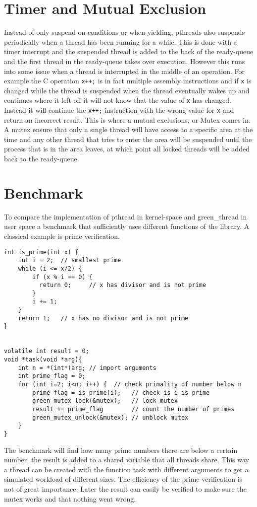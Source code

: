 \documentclass[a4paper,10pt]{article}
\begin{document}
\section*{Timer and Mutual Exclusion}
Instead of only suspend on conditions or when yielding, pthreads also suspends periodically when a thread has been running for a while. This is done with a timer interrupt and the suspended thread is added to the back of the ready-queue and the first thread in the ready-queue takes over execution. However this runs into some issue when a thread is interrupted in the middle of an operation. For example the C operation \lstinline{x++;} is in fact multiple assembly instructions and if \lstinline{x} is changed while the thread is suspended when the thread eventually wakes up and continues where it left off it will not know that the value of \lstinline{x} has changed. Instead it will continue the \lstinline{x++;} instruction with the wrong value for \lstinline{x} and return an incorrect result. This is where a mutual exclusions, or Mutex comes in. A mutex ensure that only a single thread will have access to a specific area at the time and any other thread that tries to enter the area will be suspended until the process that is in the area leaves, at which point all locked threads will be added back to the ready-queue. 

\section*{Benchmark}
To compare the implementation of pthread in kernel-space and green\_thread in user space a benchmark that sufficiently uses different functions of the library. A classical example is prime verification. 

\begin{lstlisting}[title=Benchmark]
int is_prime(int x) {
    int i = 2;  // smallest prime
    while (i <= x/2) {
        if (x % i == 0) {
          return 0;     // x has divisor and is not prime
        }
        i += 1;
    }
    return 1;   // x has no divisor and is not prime
}


volatile int result = 0; 
void *task(void *arg){
    int n = *(int*)arg; // import arguments
    int prime_flag = 0;
    for (int i=2; i<n; i++) {  // check primality of number below n
        prime_flag = is_prime(i);   // check is i is prime
        green_mutex_lock(&mutex);   // lock mutex
        result += prime_flag        // count the number of primes
        green_mutex_unlock(&mutex); // unblock mutex
    }
}
\end{lstlisting}
The benchmark will find how many prime numbers there are below a certain number, the result is added to a shared variable that all threads share. This way a thread can be created with the function task with different arguments to get a simulated workload of different sizes. The efficiency of the prime verification is not of great importance. Later the result can easily be verified to make sure the mutex works and that nothing went wrong.
\end{document}
